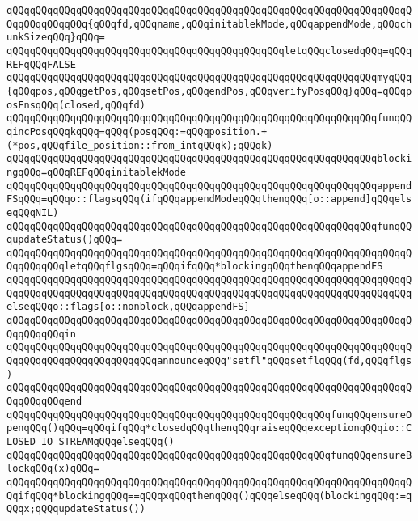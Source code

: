 \verb|qQQqqQQqqQQqqQQqqQQqqQQqqQQqqQQqqQQqqQQqqQQqqQQqqQQqqQQqqQQqqQQqqQQqqQQqqQQqqQQqqQQq{qQQqfd,qQQqname,qQQqinitablekMode,qQQqappendMode,qQQqchunkSizeqQQq}qQQq=|\newline
\verb|qQQqqQQqqQQqqQQqqQQqqQQqqQQqqQQqqQQqqQQqqQQqqQQqletqQQqclosedqQQq=qQQqREFqQQqFALSE|\newline
\verb|qQQqqQQqqQQqqQQqqQQqqQQqqQQqqQQqqQQqqQQqqQQqqQQqqQQqqQQqqQQqqQQqmyqQQq{qQQqpos,qQQqgetPos,qQQqsetPos,qQQqendPos,qQQqverifyPosqQQq}qQQq=qQQqposFnsqQQq(closed,qQQqfd)|\newline
\verb|qQQqqQQqqQQqqQQqqQQqqQQqqQQqqQQqqQQqqQQqqQQqqQQqqQQqqQQqqQQqqQQqfunqQQqincPosqQQqkqQQq=qQQq(posqQQq:=qQQqposition.+(*pos,qQQqfile_position::from_intqQQqk);qQQqk)|\newline
\verb|qQQqqQQqqQQqqQQqqQQqqQQqqQQqqQQqqQQqqQQqqQQqqQQqqQQqqQQqqQQqqQQqblockingqQQq=qQQqREFqQQqinitablekMode|\newline
\verb|qQQqqQQqqQQqqQQqqQQqqQQqqQQqqQQqqQQqqQQqqQQqqQQqqQQqqQQqqQQqqQQqappendFSqQQq=qQQqo::flagsqQQq(ifqQQqappendModeqQQqthenqQQq[o::append]qQQqelseqQQqNIL)|\newline
\verb|qQQqqQQqqQQqqQQqqQQqqQQqqQQqqQQqqQQqqQQqqQQqqQQqqQQqqQQqqQQqqQQqfunqQQqupdateStatus()qQQq=|\newline
\verb|qQQqqQQqqQQqqQQqqQQqqQQqqQQqqQQqqQQqqQQqqQQqqQQqqQQqqQQqqQQqqQQqqQQqqQQqqQQqqQQqletqQQqflgsqQQq=qQQqifqQQq*blockingqQQqthenqQQqappendFS|\newline
\verb|qQQqqQQqqQQqqQQqqQQqqQQqqQQqqQQqqQQqqQQqqQQqqQQqqQQqqQQqqQQqqQQqqQQqqQQqqQQqqQQqqQQqqQQqqQQqqQQqqQQqqQQqqQQqqQQqqQQqqQQqqQQqqQQqqQQqqQQqqQQqelseqQQqo::flags[o::nonblock,qQQqappendFS]|\newline
\verb|qQQqqQQqqQQqqQQqqQQqqQQqqQQqqQQqqQQqqQQqqQQqqQQqqQQqqQQqqQQqqQQqqQQqqQQqqQQqqQQqin|\newline
\verb|qQQqqQQqqQQqqQQqqQQqqQQqqQQqqQQqqQQqqQQqqQQqqQQqqQQqqQQqqQQqqQQqqQQqqQQqqQQqqQQqqQQqqQQqqQQqqQQqannounceqQQq"setfl"qQQqsetflqQQq(fd,qQQqflgs)|\newline
\verb|qQQqqQQqqQQqqQQqqQQqqQQqqQQqqQQqqQQqqQQqqQQqqQQqqQQqqQQqqQQqqQQqqQQqqQQqqQQqqQQqend|\newline
\verb|qQQqqQQqqQQqqQQqqQQqqQQqqQQqqQQqqQQqqQQqqQQqqQQqqQQqqQQqfunqQQqensureOpenqQQq()qQQq=qQQqifqQQq*closedqQQqthenqQQqraiseqQQqexceptionqQQqio::CLOSED_IO_STREAMqQQqelseqQQq()|\newline
\verb|qQQqqQQqqQQqqQQqqQQqqQQqqQQqqQQqqQQqqQQqqQQqqQQqqQQqqQQqfunqQQqensureBlockqQQq(x)qQQq=|\newline
\verb|qQQqqQQqqQQqqQQqqQQqqQQqqQQqqQQqqQQqqQQqqQQqqQQqqQQqqQQqqQQqqQQqqQQqqQQqifqQQq*blockingqQQq==qQQqxqQQqthenqQQq()qQQqelseqQQq(blockingqQQq:=qQQqx;qQQqupdateStatus())|\newline
